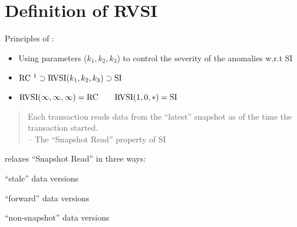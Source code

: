 \section{Definition of RVSI}



\begin{frame}{}
  Principles of \rvsi{}:
  \begin{itemize}
    \setlength{\itemsep}{10pt}
    \item<1-> Using parameters ($k_1, k_2, k_3$) to control the severity of the anomalies w.r.t SI
    \item<2-> $\rc{}~\footnotemark \supset \rvsi(k_1, k_2, k_3) \supset \si{}$
    \item<2-> $\text{RVSI}(\infty,\infty,\infty) = \text{RC} \qquad \text{RVSI}(1,0,\ast) = \text{SI}$
  \end{itemize}
\end{frame}

\begin{frame}{}
  \begin{quote}
    Each transaction reads data from the ``latest'' snapshot as of the time the transaction started.\\
    \hfill -- The ``Snapshot Read'' property of SI
  \end{quote}

  \vspace{0.60cm}
  \rvsi{} relaxes ``Snapshot Read'' in three ways:
  \pause
  \begin{description}%
    \setlength{\itemsep}{3pt}
    \item[$\konebv$ (Backward View):] ``stale'' data versions		\hfill {}
      \pause
    \item[$\ktwofv$ (Forward View):] ``forward'' data versions  	\hfill {}
      \pause
    \item[$\kthreesv$ (Snapshot View):] ``non-snapshot'' data versions	\hfill {}
  \end{description}
\end{frame}

